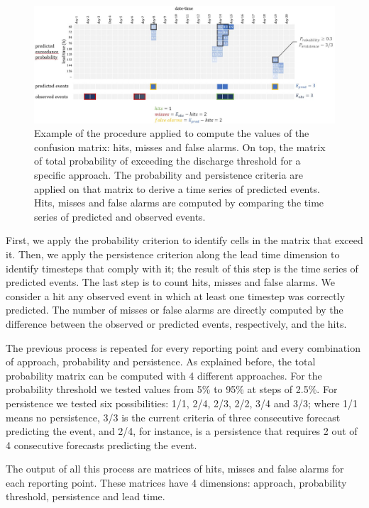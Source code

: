 \documentclass[preprint,12pt]{elsarticle}
\begin{document}
\begin{figure}
    \centering
    \includegraphics[width=1\textwidth]{figures/explanation_procedure.JPG}
    \caption{Example of the procedure applied to compute the values of the confusion matrix: hits, misses and false alarms. On top, the matrix of total probability of exceeding the discharge threshold for a specific approach. The probability and persistence criteria are applied on that matrix to derive a time series of predicted events. Hits, misses and false alarms are computed by comparing the time series of predicted and observed events.}
    \label{fig:procedure}
\end{figure}

First, we apply the probability criterion to identify cells in the matrix that exceed it. Then, we apply the persistence criterion along the lead time  dimension to identify timesteps that comply with it; the result of this step is the time series of predicted events. The last step is to count hits, misses and false alarms. We consider a hit any observed event in which at least one timestep was correctly predicted. The number of misses or false alarms are directly computed by the difference between the observed or predicted events, respectively, and the hits.

The previous process is repeated for every reporting point and every combination of approach, probability and persistence. As explained before, the total probability matrix can be computed with 4 different approaches. For the probability threshold we tested values from 5\% to 95\% at steps of 2.5\%. For persistence we tested six possibilities: 1/1, 2/4, 2/3, 2/2, 3/4 and 3/3; where 1/1 means no persistence, 3/3 is the current criteria of three consecutive forecast predicting the event, and 2/4, for instance, is a persistence that requires 2 out of 4 consecutive forecasts predicting the event.

The output of all this process are matrices of hits, misses and false alarms for each reporting point. These matrices have 4 dimensions: approach, probability threshold, persistence and lead time.
\end{document}

